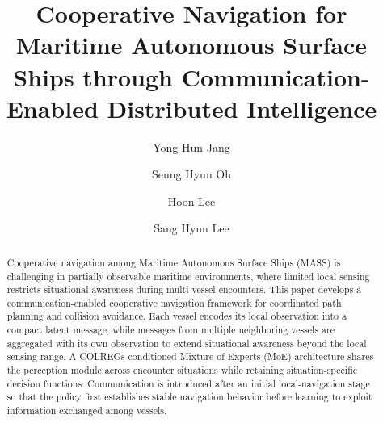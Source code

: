 \documentclass[final,5p,times,twocolumn]{elsarticle}
\begin{document}
\begin{frontmatter}

\title{Cooperative Navigation for Maritime Autonomous Surface Ships through Communication-Enabled Distributed Intelligence}

\author[label1]{Yong Hun Jang}
\author[label1]{Seung Hyun Oh}
\author[label2]{Hoon Lee}
\author[label1]{Sang Hyun Lee}



\begin{abstract}
{\color{violet}
Cooperative navigation among Maritime Autonomous Surface Ships (MASS) is challenging in partially observable maritime environments, where limited local sensing restricts situational awareness during multi-vessel encounters. This paper develops a communication-enabled cooperative navigation framework for coordinated path planning and collision avoidance. Each vessel encodes its local observation into a compact latent message, while messages from multiple neighboring vessels are aggregated with its own observation to extend situational awareness beyond the local sensing range. A COLREGs-conditioned Mixture-of-Experts (MoE) architecture shares the perception module across encounter situations while retaining situation-specific decision functions. Communication is introduced after an initial local-navigation stage so that the policy first establishes stable navigation behavior before learning to exploit information exchanged among vessels.

}
\end{abstract}
\end{frontmatter}
\end{document}
